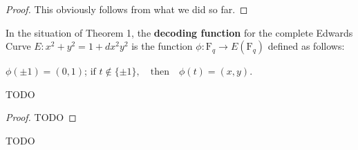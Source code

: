 \begin{proof}
  \leanok
  This obviously follows from what we did so far.
\end{proof}

\begin{definition}
  \label{def:Elligator1.ϕ}
  \leanok
  In the situation of Theorem 1, the \textbf{decoding function} for the complete Edwards Curve $E : x^2 + y^2 = 1 + d x^2 y^2$ is the function $\phi : \text{F}_q \to E(\text{F}_q)$ defined as follows:

  $\phi(\pm 1) = (0, 1)$; $\text{if } t \notin \{\pm 1\}, \quad \text{then} \quad \phi(t) = (x, y)$.
\end{definition}

\begin{theorem}[Preimages of ϕ]
  \label{thm:Elligator1.ϕ_inv_only_two_specific_preimages}
  \leanok
  TODO
\end{theorem}

\begin{proof}
  TODO
\end{proof}

\begin{definition}
  \label{def:Elligator1.E_over_F}
  \leanok
  TODO
\end{definition}

